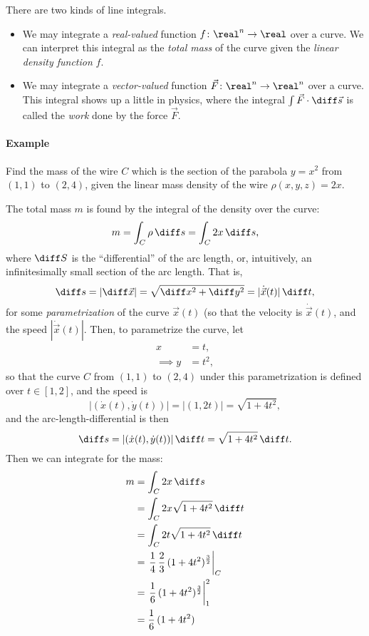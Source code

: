 \documentclass{multi}
\begin{document}
There are two kinds of line integrals.
\begin{itemize}
\item We may integrate a \emph{real-valued} function \(f \colon \real^n \to \real\) over a curve. We can interpret this integral as the \emph{total mass} of the curve given the \emph{linear density function} \(f\).

\item We may integrate a \emph{vector-valued} function \(\vec F \colon \real^n \to \real^n\) over a curve. This integral shows up a little in physics, where the integral \(\int \vec F \cdot \diff \vec s\) is called the \emph{work} done by the force \(\vec F\).
\end{itemize}

\paragraph{Example}

\begin{mdframed}
Find the mass of the wire \(C\) which is the section of the parabola \(y = x^2\) from \((1, 1)\) to \((2, 4)\), given the linear mass density of the wire \(\rho (x, y, z) = 2x\).
\end{mdframed}


The total mass \(m\) is found by the integral of the density over the curve:
\[
    m = \int_C \rho \, \diff s = \int_C 2x \, \diff s,
\]
where \(\diff S\) is the ``differential'' of the arc length, or, intuitively, an infinitesimally small section of the arc length. That is,
\[
    \diff s = |\diff \vec x| = \sqrt{\diff x^2 + \diff y^2} = |\dot {\vec x}(t)| \, \diff t,
\]
for some \emph{parametrization} of the curve \(\vec x(t)\) (so that the velocity is \(\dot{\vec x}(t)\), and the speed \(|\dot{\vec x}(t)|\). Then, to parametrize the curve, let
\begin{align*}
    x &= t, \\
    \implies y &= t^2,
\end{align*}
so that the curve \(C\) from \((1, 1)\) to \((2, 4)\) under this parametrization is defined over \(t \in [1, 2]\),
and the speed is
\[
    |(\dot x(t), \dot y(t))| = |(1, 2t)| = \sqrt{1+4t^2},
\]
and the arc-length-differential is then
\[
    \diff s = |(\dot x(t), \dot y(t))| \, \diff t = \sqrt{1+4t^2} \, \diff t.
\]
Then we can integrate for the mass:
\begin{align*}
    m &= \int_C 2x \, \diff s \\
    &= \int_C 2x \sqrt{1+4t^2} \, \diff t \\
    &= \int_C 2t \sqrt{1+4t^2} \, \diff t \\
    &= \left.\frac 1 4 \, \frac 2 3 \, (1+4t^2)^{\frac 3 2}\right\rvert_C \\
    &= \left. \frac 1 6 \, (1+4t^2)^{\frac 3 2}\right\rvert_1^2 \\
    &= \frac 1 6 \, (1+4t^2)
\end{align*}



\end{document}
